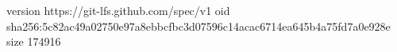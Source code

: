version https://git-lfs.github.com/spec/v1
oid sha256:5c82ac49a02750e97a8ebbcfbc3d07596c14acac6714ea645b4a75fd7a0e928e
size 174916
